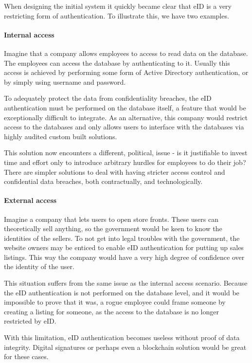 When designing the initial system it quickly became clear that eID is a very restricting form of authentication. To illustrate this, we have two examples.

\paragraph{Internal access} Imagine that a company allows employees to access to read data on the database. The employees can access the database by authenticating to it. Usually this access is achieved by performing some form of Active Directory authentication, or by simply using username and password.

To adequately protect the data from confidentiality breaches, the eID authentication must be performed on the database itself, a feature that would be exceptionally difficult to integrate. As an alternative, this company would restrict access to the databases and only allows users to interface with the databases via highly audited custom built solutions.

This solution now encounters a different, political, issue - is it justifiable to invest time and effort only to introduce arbitrary hurdles for employees to do their job? There are simpler solutions to deal with having stricter access control and confidential data breaches, both contractually, and technologically.

\paragraph{External access}

Imagine a company that lets users to open store fronts. These users can theoretically sell anything, so the government would be keen to know the identities of the sellers. To not get into legal troubles with the government, the website owners may be enticed to enable eID authentication for putting up sales listings. This way the company would have a very high degree of confidence over the identity of the user.

This situation suffers from the same issue as the internal access scenario. Because the eID authentication is not performed on the database level, and it would be impossible to prove that it was, a rogue employee could frame someone by creating a listing for someone, as the access to the database is no longer restricted by eID.

With this limitation, eID authentication becomes useless without proof of data integrity. Digital signatures or perhaps even a blockchain solution would be great for these cases.

